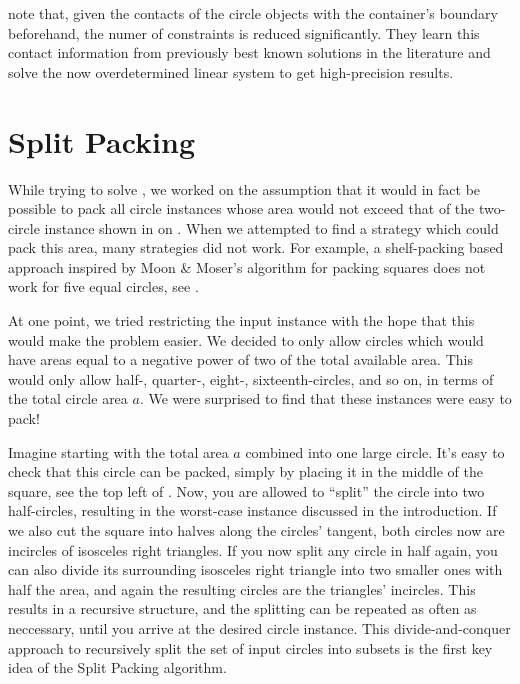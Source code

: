 \documentclass[a4paper,style=print,oneside,bibliography=totoc,nexus,lnum,extramargin]{tubsbook}
\begin{document}
\textcite{BG2010new} note that, given the contacts of the circle objects with the container's boundary beforehand, the numer of constraints is reduced significantly. They learn this contact information from previously best known solutions in the literature and solve the now overdetermined linear system to get high-precision results.

\chapter{Split Packing}\label{ch:split-packing}

While trying to solve , we worked on the assumption that it would in fact be possible to pack all circle instances whose area would not exceed that of the two-circle instance shown in  on .%
When we attempted to find a strategy which could pack this area, many strategies did not work. For example, a shelf-packing based approach inspired by Moon \& Moser's algorithm for packing squares does not work for five equal circles, see .


At one point, we tried restricting the input instance with the hope that this would make the problem easier. We decided to only allow circles which would have areas equal to a negative power of two of the total available area. This would only allow half-, quarter-, eight-, sixteenth-circles, and so on, in terms of the total circle area $a$. We were surprised to find that these instances were easy to pack!

Imagine starting with the total area $a$ combined into one large circle. It's easy to check that this circle can be packed, simply by placing it in the middle of the square, see the top left of . Now, you are allowed to “split” the circle into two half-circles, resulting in the worst-case instance discussed in the introduction. If we also cut the square into halves along the circles' tangent, both circles now are incircles of isosceles right triangles.
If you now split any circle in half again, you can also divide its surrounding isosceles right triangle into two smaller ones with half the area, and again the resulting circles are the triangles' incircles.
This results in a recursive structure, and the splitting can be repeated as often as neccessary, until you arrive at the desired circle instance. This divide-and-conquer approach to recursively split the set of input circles into subsets is the first key idea of the Split Packing algorithm.
\end{document}

